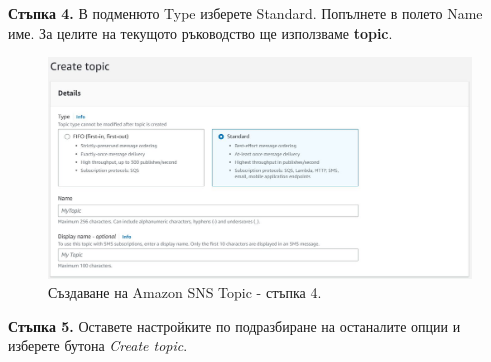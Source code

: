 \documentclass[12pt]{article}
\begin{document}
\noindent\textbf{Стъпка 4.} В подменюто Type изберете Standard. Попълнете в полето Name име. За целите на текущото ръководство ще използваме \textbf{topic}.
\begin{figure}[h!]
\centering
    \includegraphics[scale=0.4]{instructions/sns/4.JPG}
  \caption{Създаване на Amazon SNS Topic - стъпка 4.}
\end{figure}

\noindent\textbf{Стъпка 5.} Оставете настройките по подразбиране на останалите опции и изберете бутона \textit{Create topic}.
\end{document}
